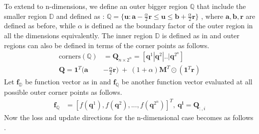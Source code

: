 To extend to n-dimensions, we define an outer bigger region $\mathbb{Q}$ that include the smaller region $\mathbb{D} $ and defined as : $\mathbb{Q} = \{\mathbf{u}: \mathbf{a} - \frac{\alpha}{2}\mathbf{r} \leq \mathbf{u} \leq \mathbf{b} + \frac{\alpha}{2}\mathbf{r} \}$ , where $\mathbf{a},\mathbf{b},\mathbf{r}$ are defined as before, while $\alpha$ is defined as the boundary factor of the outer region in all the dimensions equivalently. The inner region $\mathbb{D}$ is defined as in \eqLabel{\ref{eq:n-corners}} and outer regions can also be defined in terms of the corner points as follows.
\begin{equation}
\begin{aligned} 
\text{corners}(\mathbb{Q}) &= \mathbf{Q}_{n\times 2^{n}} = \left[\mathbf{q}^{1} | \mathbf{q}^{2} |.. | \mathbf{q}^{2^{n}}\right] \\
\mathbf{Q} = \mathbf{1}^{T}(\mathbf{a}& - \frac{\alpha}{2}\mathbf{r})~ +~ (1+\alpha)\mathbf{M}^{T} \odot (\mathbf{1}^{T}\mathbf{r}) 
\label{eq:n-corners2}
\end{aligned}
\end{equation}
Let $\mathbf{f}_{\mathbb{D}}$ be function vector as in \eqLabel{\ref{eq:n-function}} and $\mathbf{f}_{\mathbb{Q}}$ be another function vector evaluated at all possible outer corner points as follows.
\begin{equation}
\begin{aligned} 
\mathbf{f}_{\mathbb{Q}} &= \left[f(\mathbf{q}^{1}), f(\mathbf{q}^{2}),...,f(\mathbf{q}^{2^{n}}) \right]^{T} , ~ \mathbf{q^{i}} = \mathbf{Q}_{:,i}
\label{eq:n-function-outer}
\end{aligned}
\end{equation}
Now the loss and update directions for the n-dimensional case becomes as follows .
